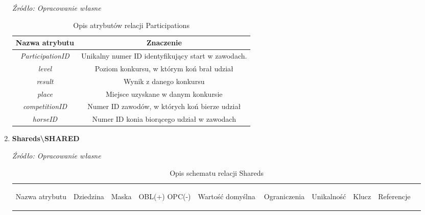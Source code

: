 \documentclass[12pt,oneside]{report}
\begin{document}
\begin{enumerate}[start=10,label={\bfseries REL\textbackslash\arabic*}]
	\begin{table}[H]
		\caption{Opis atrybutów relacji Participations}
		\textit{Źródło: Opracowanie własne}
		\label{ParticipationsAttributeDescription}
		\centering
		\begin{tabular}{|c|c|}
			\hline
			Nazwa atrybutu & Znaczenie \\
			\hline			
			\textit{ParticipationID}&Unikalny numer ID identyfikujący start w zawodach.\\	
			\hline			
			\textit{level}&Poziom konkursu, w którym koń brał udział\\	
			\hline			
			\textit{result}&Wynik z danego konkursu\\	
			\hline			
			\textit{place}&Miejsce uzyskane w danym konkursie\\	
			\hline			
			\textit{competitionID}& Numer ID zawodów, w których koń bierze udział\\	
			\hline
			\textit{horseID}&Numer ID konia biorącego udział w zawodach\\	
			\hline
		\end{tabular}
	\end{table}
\newpage
	\item \textbf{Shareds\textbackslash SHARED} 
	\begin{table}[H]
		\caption{Opis schematu relacji Shareds}
		\textit{Źródło: Opracowanie własne}
		\label{SharedsRelationSchema}
		\centering
		\begin{tabular}{|c|c|c|c|c|c|c|c|c|c|}
			\hline
			\begin{sideways}Nazwa atrybutu\end{sideways}& 
			\begin{sideways}Dziedzina \end{sideways}& 
			\begin{sideways}Maska \end{sideways}& 
			\begin{sideways}OBL(+) OPC(-)\end{sideways} & 
			\begin{sideways}Wartość domyślna$\ $\end{sideways}& 
			\begin{sideways}Ograniczenia\end{sideways} &
			\begin{sideways}Unikalność \end{sideways}& 
			\begin{sideways}Klucz \end{sideways}& 
			\begin{sideways}Referencje \end{sideways}&

\end{tabular}
\end{table}
\end{enumerate}
\end{document}
